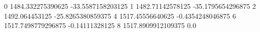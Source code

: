0 1484.332275390625 -33.5587158203125
1 1482.71142578125 -35.1795654296875
2 1492.064453125 -25.8265380859375
4 1517.45556640625 -0.4354248046875
6 1517.7498779296875 -0.14111328125
8 1517.8909912109375 0.0
